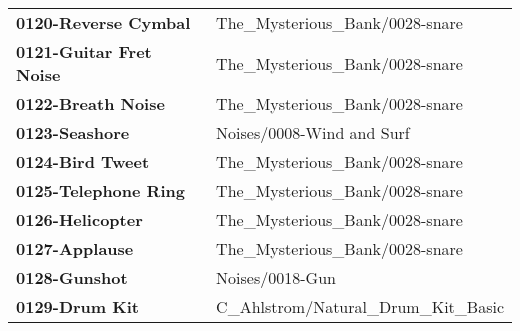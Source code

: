 \begin{longtable}{|l l|}
   \textbf{0120-Reverse Cymbal} &
      The\_Mysterious\_Bank/0028-snare \\
   \textbf{0121-Guitar Fret Noise} &
      The\_Mysterious\_Bank/0028-snare \\
   \textbf{0122-Breath Noise} &
      The\_Mysterious\_Bank/0028-snare \\
   \textbf{0123-Seashore} &
      Noises/0008-Wind and Surf \\
   \textbf{0124-Bird Tweet} &
      The\_Mysterious\_Bank/0028-snare \\
   \textbf{0125-Telephone Ring} &
      The\_Mysterious\_Bank/0028-snare \\
   \textbf{0126-Helicopter} &
      The\_Mysterious\_Bank/0028-snare \\
   \textbf{0127-Applause} &
      The\_Mysterious\_Bank/0028-snare \\
   \textbf{0128-Gunshot} &
      Noises/0018-Gun \\
   \textbf{0129-Drum Kit} &
      C\_Ahlstrom/Natural\_Drum\_Kit\_Basic \\
\end{longtable}

